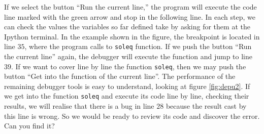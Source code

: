 \begin{paracol}{2}
If we select the button ``Run the current line,'' the program will execute the code line marked with the green arrow and stop in the following line. In each step, we can check the values the variables so far defined take by asking for them at the Ipython terminal. In the example shown in the figure, the breakpoint is located in line $35$, where the program calls to \texttt{soleq} function. If we push the button ``Run the current line'' again, the debugger will execute the function and jump to line $39$. If we want to cover line by line the function \texttt{soleq}, then we may push the button ``Get into the function of the current line''. The performance of the remaining debugger tools is easy to understand, looking at figure \ref{fig:depu2}. If we get into the function \texttt{soleq} and execute its code line by line, checking their results, we will realise that there is a bug in line $28$ because the result cast by this line is wrong. So we would be ready to review its code and discover the error. Can you find it?
\end{paracol}

